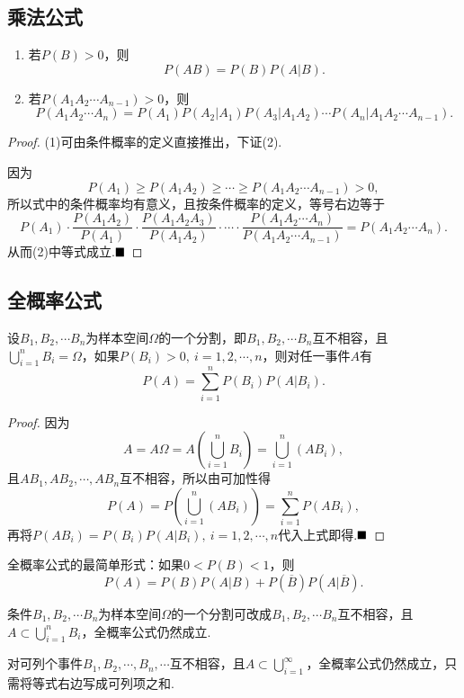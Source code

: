 \subsection{乘法公式}
\begin{theorem}[乘法公式]
	\begin{enumerate}
		\item 若$P(B)>0$，则
		$$P(AB)=P(B)P(A|B).$$
		\item 若$P(A_1A_2\cdots A_{n-1})>0$，则
		$$P(A_1A_2\cdots A_n)=P(A_1)P(A_2|A_1)P(A_3|A_1A_2)\cdots P(A_n|A_1A_2\cdots A_{n-1}).$$
	\end{enumerate}
\end{theorem}
\begin{proof}
	(1)可由条件概率的定义直接推出，下证(2).
	
	因为
	$$P(A_1)\geqslant P(A_1A_2)\geqslant\cdots\geqslant P(A_1A_2\cdots A_{n-1})>0,$$
	所以式中的条件概率均有意义，且按条件概率的定义，等号右边等于
	$$P(A_1)\cdot\frac{P(A_1A_2)}{P(A_1)}\cdot\frac{P(A_1A_2A_3)}{P(A_1A_2)}\cdot\cdots\cdot\frac{P(A_1A_2\cdots A_n)}{P(A_1A_2\cdots A_{n-1})}=P(A_1A_2\cdots A_n).$$
	从而(2)中等式成立.$\hfill\blacksquare$
\end{proof}
\subsection{全概率公式}
\begin{theorem}[全概率公式]
	设$B_1,B_2,\cdots B_n$为样本空间$\varOmega$的一个分割，即$B_1,B_2,\cdots B_n$互不相容，且$\bigcup\limits_{i=1}^{n}B_i=\varOmega$，如果$P(B_i)>0,\ i=1,2,\cdots,n$，则对任一事件$A$有
	$$P(A)=\sum_{i=1}^{n}P(B_i)P(A|B_i).$$
\end{theorem}
\begin{proof}
	因为
	$$A=A\varOmega=A\left(\bigcup_{i=1}^{n}B_i\right)=\bigcup_{i=1}^{n}(AB_i),$$
	且$AB_1,AB_2,\cdots,AB_n$互不相容，所以由可加性得
	$$P(A)=P\left(\bigcup_{i=1}^{n}(AB_i)\right)=\sum_{i=1}^{n}P(AB_i),$$
	再将$P(AB_i)=P(B_i)P(A|B_i),\ i=1,2,\cdots,n$代入上式即得.$\hfill\blacksquare$
\end{proof}
\begin{remark}
	全概率公式的最简单形式：如果$0<P(B)<1$，则
	$$P(A)=P(B)P(A|B)+P(\overline{B})P(A|\overline{B}).$$
\end{remark}
\begin{remark}
	条件$B_1,B_2,\cdots B_n$为样本空间$\varOmega$的一个分割可改成$B_1,B_2,\cdots B_n$互不相容，且$A\subset\bigcup\limits_{i=1}^{n}B_i$，全概率公式仍然成立.
\end{remark}
\begin{remark}
	对可列个事件$B_1,B_2,\cdots,B_n,\cdots$互不相容，且$A\subset\bigcup\limits_{i=1}^{\infty}$，全概率公式仍然成立，只需将等式右边写成可列项之和.
\end{remark}
